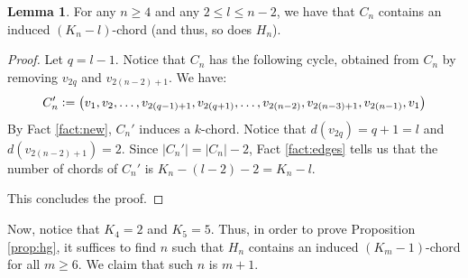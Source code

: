 \documentclass[12pt]{article}
\theoremstyle{definition}
\newtheorem{lemma}[thm]{Lemma}
\newcommand{\defeq}{\vcentcolon=}
\begin{document}
    \begin{lemma} \label{lemma:most}
        For any  $n \geq 4$ and
        any $2 \leq l \leq n-2$,
        we have that $C_{n}$ contains an induced
        $\left(K_{n} - l\right)$-chord
        (and thus, so does $H_{n}$).
    \end{lemma}
    \begin{proof}
        Let $q = l-1$. Notice that
        $C_{n}$ has the following
        cycle, obtained from $C_{n}$
        by removing $v_{2q}$ and
        $v_{2\left(n-2\right)+1}$.
        We have:
        \begin{gather*}
            C_{n}' \defeq
            \left(v_1, v_2, \ldots,
            v_{2\left(q-1\right)+1},
            v_{2\left(q+1\right)}, \ldots ,
            v_{2\left(n-2\right)},
            v_{2\left(n-3\right) + 1},
            v_{2\left(n-1\right)}, v_1\right)
        \end{gather*}
        By Fact \ref{fact:new}, 
        $C_{n}'$ induces a $k$-chord.
        Notice that
        $d\left(v_{2q}\right) = q+1 = l$
        and $d\left(v_{2\left(n-2\right)+1}\right) = 2$.
        Since $\left|C_{n}'\right| = 
        \left|C_{n}\right| - 2$, 
        Fact \ref{fact:edges} tells
        us that the number of 
        chords of $C_{n}'$ is
        $K_{n} - \left(l-2\right) - 2 = K_{n} - l$.
        
        This concludes the proof.
    \end{proof}

    Now, notice that $K_{4} = 2$ and $K_{5} = 5$.
    Thus, in order to prove Proposition \ref{prop:hg},
    it suffices to find $n$ such that $H_{n}$ contains
    an induced $\left(K_{m}-1\right)$-chord for
    all $m \geq 6$. We claim that such $n$ is $m+1$.
\end{document}
